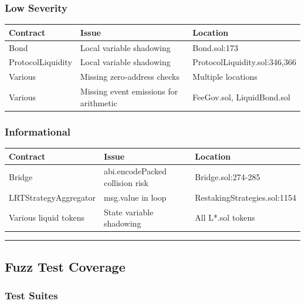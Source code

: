\documentclass[
]{article}
\newcounter{none} %
\begin{document}
\subsubsection{Low Severity}\label{low-severity}

{\def\LTcaptype{none} %
\begin{longtable}[]{@{}lll@{}}
\toprule\noalign{}
Contract & Issue & Location \\
\midrule\noalign{}
\endhead
\bottomrule\noalign{}
\endlastfoot
Bond & Local variable shadowing & Bond.sol:173 \\
ProtocolLiquidity & Local variable shadowing &
ProtocolLiquidity.sol:346,366 \\
Various & Missing zero-address checks & Multiple locations \\
Various & Missing event emissions for arithmetic & FeeGov.sol,
LiquidBond.sol \\
\end{longtable}
}

\subsubsection{Informational}\label{informational}

{\def\LTcaptype{none} %
\begin{longtable}[]{@{}lll@{}}
\toprule\noalign{}
Contract & Issue & Location \\
\midrule\noalign{}
\endhead
\bottomrule\noalign{}
\endlastfoot
Bridge & abi.encodePacked collision risk & Bridge.sol:274-285 \\
LRTStrategyAggregator & msg.value in loop &
RestakingStrategies.sol:1154 \\
Various liquid tokens & State variable shadowing & All L*.sol tokens \\
\end{longtable}
}

\begin{center}\rule{0.5\linewidth}{0.5pt}\end{center}

\subsection{Fuzz Test Coverage}\label{fuzz-test-coverage}

\subsubsection{Test Suites}\label{test-suites}
\end{document}

